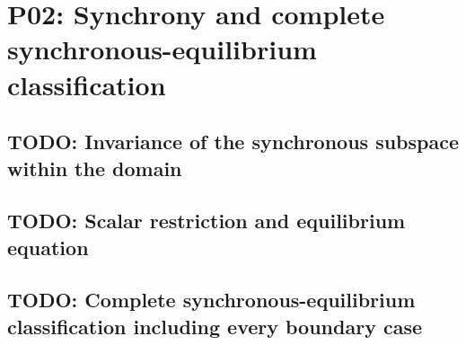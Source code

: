
\section{P02: Synchrony and complete synchronous-equilibrium classification}
\label{sec:P02}

\subsection{TODO: Invariance of the synchronous subspace within the domain}
\label{slot:P02-1}

\subsection{TODO: Scalar restriction and equilibrium equation}
\label{slot:P02-2}

\subsection{TODO: Complete synchronous-equilibrium classification including every boundary case}
\label{slot:P02-3}
